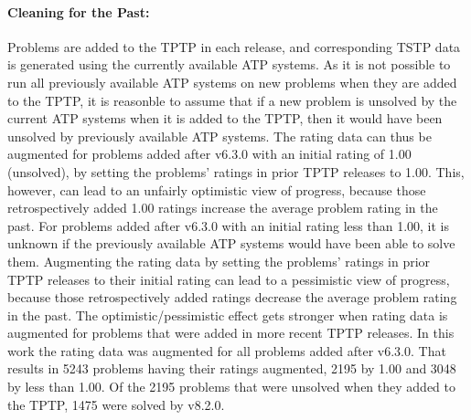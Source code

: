 \documentclass[runningheads]{llncs}
\begin{document}
\paragraph{Cleaning for the Past:}
Problems are added to the TPTP in each release, and corresponding TSTP data is generated using 
the currently available ATP systems.
As it is not possible to run all previously available ATP systems on new problems when they 
are added to the TPTP, it is reasonble to assume that if a new problem is unsolved by the 
current ATP systems when it is added to the TPTP, then it would have been unsolved by 
previously available ATP systems.
The rating data can thus be augmented for problems added after v6.3.0 with an initial rating 
of 1.00 (unsolved), by setting the problems' ratings in prior TPTP releases to 1.00.
This, however, can lead to an unfairly optimistic view of progress, because those retrospectively 
added 1.00 ratings increase the average problem rating in the past.
For problems added after v6.3.0 with an initial rating less than 1.00, it is unknown if the
previously available ATP systems would have been able to solve them.
Augmenting the rating data by setting the problems' ratings in prior TPTP releases to their 
initial rating can lead to a pessimistic view of progress, because those retrospectively
added ratings decrease the average problem rating in the past.
The optimistic/pessimistic effect gets stronger when rating data is augmented for problems that
were added in more recent TPTP releases.
In this work the rating data was augmented for all problems added after v6.3.0.
That results in 5243 problems having their ratings augmented, 2195 by 1.00 and 3048 by less than 
1.00.
Of the 2195 problems that were unsolved when they added to the TPTP, 1475 were solved by v8.2.0.
\end{document}
